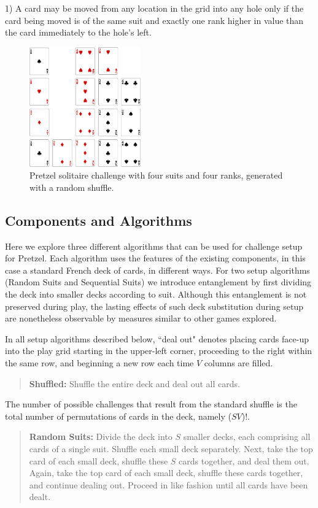 \documentclass[journal]{IEEEtran}
\begin{document}
1) A card may be moved from any location in the grid into any hole only if the card being moved is of the same suit and exactly one rank higher in value than the card immediately to the hole's left.

\begin{figure}[t]
\centering
\includegraphics[width=4.8cm]{pretzelbasic.png}
\caption{Pretzel solitaire challenge with four suits and four ranks, generated with a random shuffle.}
\label{fig:pretzelbasic}
\end{figure}

\subsection{Components and Algorithms}
Here we explore three different algorithms that can be used for challenge setup for Pretzel. Each algorithm uses the features of the existing components, in this case a standard French deck of cards, in different ways. For two setup algorithms (Random Suits and Sequential Suits) we introduce entanglement by first dividing the deck into smaller decks according to suit. Although this entanglement is not preserved during play, the lasting effects of such deck substitution during setup are nonetheless observable by measures similar to other games explored.

In all setup algorithms described below, ``deal out" denotes placing cards face-up into the play grid starting in the upper-left corner, proceeding to the right within the same row, and beginning a new row each time $V$ columns are filled.

\begin{quote}
    {\bf Shuffled:} Shuffle the entire deck and deal out all cards.
\end{quote}

The number of possible challenges that result from the standard shuffle is the total number of permutations of cards in the deck, namely ($S$$V$)!.

\begin{quote}
    {\bf Random Suits:} Divide the deck into $S$ smaller decks, each comprising all cards of a single suit. Shuffle each small deck separately. Next, take the top card of each small deck, shuffle these $S$ cards together, and deal them out. Again, take the top card of each small deck, shuffle these cards together, and continue dealing out. Proceed in like fashion until all cards have been dealt.
\end{quote}
\end{document}
